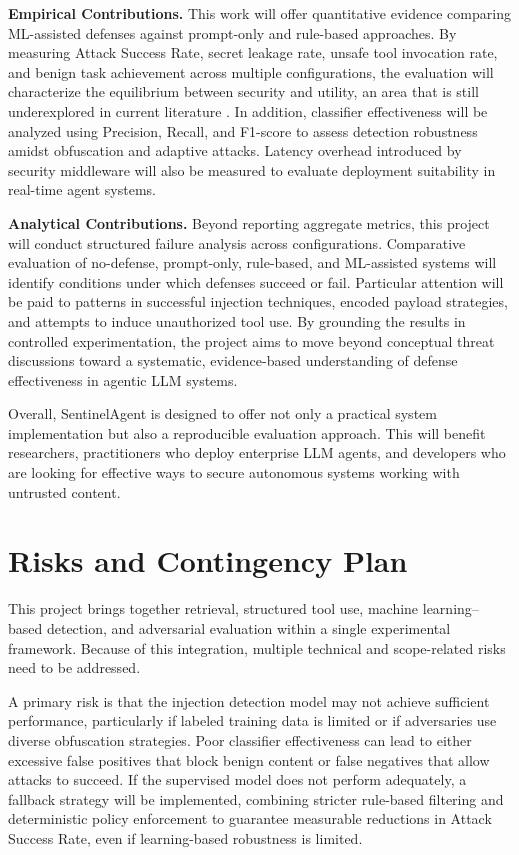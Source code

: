 \documentclass[11pt]{article}
\begin{document}
\textbf{Empirical Contributions.}
This work will offer quantitative evidence comparing ML-assisted defenses against prompt-only and rule-based approaches. By measuring Attack Success Rate, secret leakage rate, unsafe tool invocation rate, and benign task achievement across multiple configurations, the evaluation will characterize the equilibrium between security and utility, an area that is still underexplored in current literature \cite{deng2025agentsurvey}. In addition, classifier effectiveness will be analyzed using Precision, Recall, and F1-score to assess detection robustness amidst obfuscation and adaptive attacks. Latency overhead introduced by security middleware will also be measured to evaluate deployment suitability in real-time agent systems.

\textbf{Analytical Contributions.}
Beyond reporting aggregate metrics, this project will conduct structured failure analysis across configurations. Comparative evaluation of no-defense, prompt-only, rule-based, and ML-assisted systems will identify conditions under which defenses succeed or fail. Particular attention will be paid to patterns in successful injection techniques, encoded payload strategies, and attempts to induce unauthorized tool use. By grounding the results in controlled experimentation, the project aims to move beyond conceptual threat discussions toward a systematic, evidence-based understanding of defense effectiveness in agentic LLM systems.

Overall, SentinelAgent is designed to offer not only a practical system implementation but also a reproducible evaluation approach. This will benefit researchers, practitioners who deploy enterprise LLM agents, and developers who are looking for effective ways to secure autonomous systems working with untrusted content.

\section{Risks and Contingency Plan}
This project brings together retrieval, structured tool use, machine learning--based detection, and adversarial evaluation within a single experimental framework. Because of this integration, multiple technical and scope-related risks need to be addressed.

A primary risk is that the injection detection model may not achieve sufficient performance, particularly if labeled training data is limited or if adversaries use diverse obfuscation strategies. Poor classifier effectiveness can lead to either excessive false positives that block benign content or false negatives that allow attacks to succeed. If the supervised model does not perform adequately, a fallback strategy will be implemented, combining stricter rule-based filtering and deterministic policy enforcement to guarantee measurable reductions in Attack Success Rate, even if learning-based robustness is limited.
\end{document}
